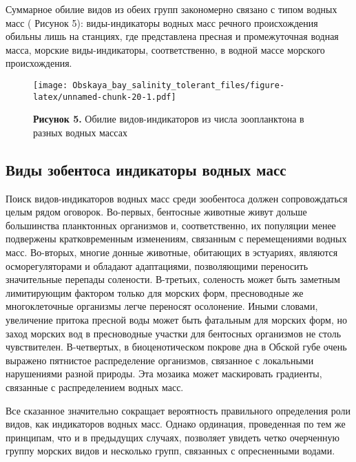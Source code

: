 \documentclass[
]{article}
\begin{document}
Суммарное обилие видов из обеих групп закономерно связано с типом водных
масс ( Рисунок 5): виды-индикаторы водных масс речного происхождения
обильны лишь на станциях, где представлена пресная и промежуточная
водная масса, морские виды-индикаторы, соответственно, в водной массе
морского происхождения.

\begin{figure}
\centering
\texttt{[image: Obskaya\_bay\_salinity\_tolerant\_files/figure-latex/unnamed-chunk-20-1.pdf]}
\caption{\textbf{Рисунок 5.} Обилие видов-индикаторов из числа
зоопланктона в разных водных массах}
\end{figure}

\hypertarget{ux432ux438ux434ux44b-ux437ux43eux431ux435ux43dux442ux43eux441ux430-ux438ux43dux434ux438ux43aux430ux442ux43eux440ux44b-ux432ux43eux434ux43dux44bux445-ux43cux430ux441ux441}{%
\subsection{Виды зобентоса индикаторы водных
масс}\label{ux432ux438ux434ux44b-ux437ux43eux431ux435ux43dux442ux43eux441ux430-ux438ux43dux434ux438ux43aux430ux442ux43eux440ux44b-ux432ux43eux434ux43dux44bux445-ux43cux430ux441ux441}}

Поиск видов-индикаторов водных масс среди зообентоса должен
сопровождаться целым рядом оговорок. Во-первых, бентосные животные живут
дольше большинства планктонных организмов и, соответственно, их
популяции менее подвержены кратковременным изменениям, связанным с
перемещениями водных масс. Во-вторых, многие донные животные, обитающих
в эстуариях, являются осморегуляторами и обладают адаптациями,
позволяющими переносить значительные перепады солености. В-третьих,
соленость может быть заметным лимитирующим фактором только для морских
форм, пресноводные же многоклеточные организмы легче переносят
осолонение. Иными словами, увеличение притока пресной воды может быть
фатальным для морских форм, но заход морских вод в пресноводные участки
для бентосных организмов не столь чувствителен. В-четвертых, в
биоценотическом покрове дна в Обской губе очень выражено пятнистое
распределение организмов, связанное с локальными нарушениями разной
природы. Эта мозаика может маскировать градиенты, связанные с
распределением водных масс.

Все сказанное значительно сокращает вероятность правильного определения
роли видов, как индикаторов водных масс. Однако ординация, проведенная
по тем же принципам, что и в предыдущих случаях, позволяет увидеть четко
очерченную группу морских видов и несколько групп, связанных с
опресненными водами.
\end{document}
